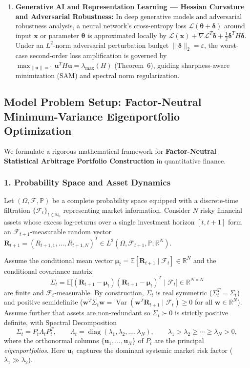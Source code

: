 \documentclass[11pt, letterpaper]{article}
\theoremstyle{definition}
\theoremstyle{remark}
\newcommand{\R}{\mathbb{R}}
\newcommand{\N}{\mathbb{N}}
\newcommand{\E}{\mathbb{E}}
\newcommand{\Prob}{\mathbb{P}}
\begin{document}
\begin{enumerate}[label=\textbf{Scenario \arabic*:}]
    \item \textbf{Generative AI and Representation Learning — Hessian Curvature and Adversarial Robustness:}
    In deep generative models and adversarial robustness analysis, a neural network's cross-entropy loss $\mathcal{L}(\boldsymbol{\theta} + \boldsymbol{\delta})$ around input $\mathbf{x}$ or parameter $\boldsymbol{\theta}$ is approximated locally by $\mathcal{L}(\mathbf{x}) + \nabla \mathcal{L}^T \boldsymbol{\delta} + \frac{1}{2}\boldsymbol{\delta}^T H \boldsymbol{\delta}$. Under an $L^2$-norm adversarial perturbation budget $\|\boldsymbol{\delta}\|_2 = \varepsilon$, the worst-case second-order loss amplification is governed by $\max_{\|\mathbf{u}\|=1} \mathbf{u}^T H \mathbf{u} = \lambda_{\max}(H)$ (Theorem~6), guiding sharpness-aware minimization (SAM) and spectral norm regularization.
\end{enumerate}

\subsection{Model Problem Setup: Factor-Neutral Minimum-Variance Eigenportfolio Optimization}
We formulate a rigorous mathematical framework for \textbf{Factor-Neutral Statistical Arbitrage Portfolio Construction} in quantitative finance.

\subsubsection*{1. Probability Space and Asset Dynamics}
Let $(\Omega, \mathcal{F}, \Prob)$ be a complete probability space equipped with a discrete-time filtration $\{\mathcal{F}_t\}_{t \in \N_0}$ representing market information. Consider $N$ risky financial assets whose excess log-returns over a single investment horizon $[t, t+1]$ form an $\mathcal{F}_{t+1}$-measurable random vector $\mathbf{R}_{t+1} = (R_{t+1,1}, \dots, R_{t+1,N})^T \in L^2(\Omega, \mathcal{F}_{t+1}, \Prob; \R^N)$.

Assume the conditional mean vector $\boldsymbol{\mu}_t = \E[\mathbf{R}_{t+1} \mid \mathcal{F}_t] \in \R^N$ and the conditional covariance matrix
\[
\Sigma_t = \E\bigl[(\mathbf{R}_{t+1} - \boldsymbol{\mu}_t)(\mathbf{R}_{t+1} - \boldsymbol{\mu}_t)^T \mid \mathcal{F}_t\bigr] \in \R^{N \times N}
\]
are finite and $\mathcal{F}_t$-measurable. By construction, $\Sigma_t$ is real symmetric ($\Sigma_t^T = \Sigma_t$) and positive semidefinite ($\mathbf{w}^T \Sigma_t \mathbf{w} = \operatorname{Var}(\mathbf{w}^T \mathbf{R}_{t+1} \mid \mathcal{F}_t) \ge 0$ for all $\mathbf{w} \in \R^N$). Assume further that assets are non-redundant so $\Sigma_t \succ 0$ is strictly positive definite, with Spectral Decomposition
\[
\Sigma_t = P_t \Lambda_t P_t^T, \qquad \Lambda_t = \operatorname{diag}(\lambda_1, \lambda_2, \dots, \lambda_N), \qquad \lambda_1 > \lambda_2 \ge \cdots \ge \lambda_N > 0,
\]
where the orthonormal columns $\{\mathbf{u}_1, \dots, \mathbf{u}_N\}$ of $P_t$ are the principal \emph{eigenportfolios}. Here $\mathbf{u}_1$ captures the dominant systemic market risk factor ($\lambda_1 \gg \lambda_2$).
\end{document}

